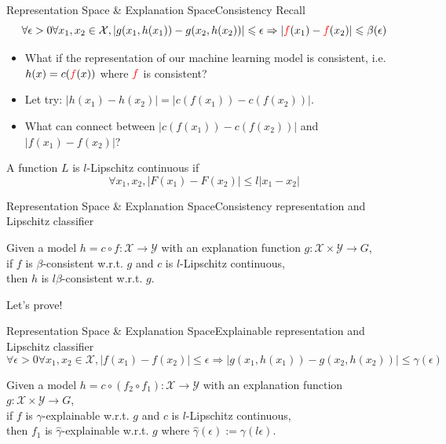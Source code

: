 \documentclass[10pt, aspectratio=169]{beamer}
\begin{document}
	\begin{frame}[t]{Representation Space \& Explanation Space}{Consistency Recall}
		$$
		\forall\epsilon>0\forall x_1, x_2 \in \mathcal{X}, \left|g(x_1, h(x_1)) - g(x_2,h(x_2))\right|\leqslant\epsilon \Rightarrow \left|\mathcolor{red}{f}(x_1) - \mathcolor{red}{f}(x_2)\right|\leqslant \beta(\epsilon)
		$$
		\begin{itemize}
			\item What if the representation of our machine learning model is consistent, i.e. $h(x)=c(\mathcolor{red}{f}(x))$ where $\mathcolor{red}{f}$ is consistent?
			
			\item Let try: $\left|h(x_1) - h(x_2)\right| = \left|c(f(x_1)) - c(f(x_2))\right|$.
			
			\item What can connect between $\left|c(f(x_1)) - c(f(x_2))\right|$ and $\left|f(x_1) - f(x_2)\right|$?
		\end{itemize}
		
		\begin{definition}
			A function $L$ is $l$-Lipschitz continuous if
			$$
			\forall x_1, x_2, \left|F(x_1)-F(x_2)\right|\leqslant l \left|x_1 - x_2\right|
			$$
		\end{definition}
	\end{frame}
	\begin{frame}[t]{Representation Space \& Explanation Space}{Consistency representation and Lipschitz classifier}
		\begin{theorem}
			Given a model $h=c\circ f : \mathcal{X}\to\mathcal{Y}$ with an explanation function $g:\mathcal{X}\times\mathcal{Y}\to G$,\\
			if $f$ is $\beta$-consistent w.r.t. $g$ and $c$ is $l$-Lipschitz continuous,\\
			then $h$ is $l\beta$-consistent w.r.t. $g$.
		\end{theorem}
		Let's prove!
	\end{frame}
	
	\begin{frame}[t]{Representation Space \& Explanation Space}{Explainable representation and Lipschitz classifier}
		$$
		\forall\epsilon>0\forall x_1, x_2 \in \mathcal{X}, \left|f(x_1) - f(x_2)\right|\leqslant\epsilon \Rightarrow  \left|g(x_1, h(x_1)) - g(x_2,h(x_2))\right|\leqslant\gamma(\epsilon)
		$$
		\begin{theorem}
			Given a model $h=c\circ (f_2 \circ f_1) : \mathcal{X}\to\mathcal{Y}$ with an explanation function $g:\mathcal{X}\times\mathcal{Y}\to G$,\\
			if $f$ is $\gamma$-explainable w.r.t. $g$ and $c$ is $l$-Lipschitz continuous,\\
			then $f_1$ is $\hat{\gamma}$-explainable w.r.t. $g$ where $\hat{\gamma}(\epsilon):=\gamma(l\epsilon)$.
		\end{theorem}
	\end{frame}
	
\end{document}
